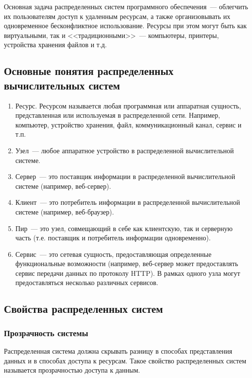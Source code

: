 Основная задача распределенных систем программного обеспечения~--- облегчить их пользователям доступ к удаленным ресурсам, а также организовывать их одновременное бесконфликтное использование. Ресурсы при этом могут быть как виртуальными, так и <<традиционными>>~--- компьютеры, принтеры, устройства хранения файлов и т.д.

\subsection{Основные понятия распределенных вычислительных систем}
\begin{enumerate}
\item Ресурс. Ресурсом называется любая программная или аппаратная сущность, представленная или используемая в распределенной сети. Например, компьютер, устройство хранения, файл, коммуникационный канал, сервис и т.п.
\item Узел~--- любое аппаратное устройство в распределенной вычислительной системе.
\item Сервер~--- это поставщик информации в распределенной вычислительной системе (например, веб-сервер).
\item Клиент~--- это потребитель информации в распределенной вычислительной системе (например, веб-браузер).
\item Пир~--- это узел, совмещающий в себе как клиентскую, так и серверную часть (т.е. поставщик и потребитель информации одновременно).
\item Сервис~--- это сетевая сущность, предоставляющая определенные функциональные возможности (например, веб-сервер может предоставлять сервис передачи данных по протоколу HTTP). В рамках одного узла могут предоставляться несколько различных сервисов.
\end{enumerate}

\subsection{Свойства распределенных систем}
\subsubsection{Прозрачность системы}
Распределенная система должна скрывать разницу в способах представления данных и в способах доступа к ресурсам. Такое свойство распределенных систем называется прозрачностью доступа к данным.

